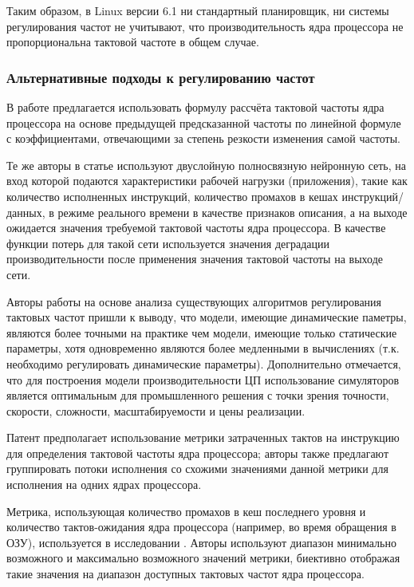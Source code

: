     Таким образом, в Linux версии 6.1 ни стандартный планировщик, ни системы регулирования частот
    не учитывают, что производительность ядра процессора не пропорциональна тактовой частоте
    в общем случае.

\subsubsection{Альтернативные подходы к регулированию частот}

    В работе \cite{liang2013performance} предлагается использовать формулу рассчёта тактовой частоты
    ядра процессора на основе предыдущей предсказанной частоты по линейной формуле с коэффициентами,
    отвечающими за степень резкости изменения самой частоты.

    Те же авторы в статье
    \cite{chen2018learning} используют двуслойную полносвязную нейронную сеть, на вход которой
    подаются характеристики рабочей нагрузки (приложения), такие как количество исполненных инструкций,
    количество промахов в кешах инструкций/данных, в режиме реального времени в качестве
    признаков описания, а на выходе ожидается значения требуемой тактовой частоты ядра процессора.
    В качестве функции потерь для такой сети используется значения деградации производительности после
    применения значения тактовой частоты на выходе сети.

    Авторы работы \cite{haririan2020dvfs} на основе анализа существующих алгоритмов регулирования
    тактовых частот пришли к выводу, что модели, имеющие динамические паметры, являются более точными
    на практике чем модели, имеющие только статические параметры, хотя одновременно являются более
    медленными в вычислениях (т.к. необходимо регулировать динамические параметры). Дополнительно
    отмечается, что для построения модели производительности ЦП использование симуляторов является
    оптимальным для промышленного решения с точки зрения точности, скорости, сложности,
    масштабируемости и цены реализации.

    Патент \cite{johnson2012frequency} предполагает использование метрики затраченных тактов на
    инструкцию для определения тактовой частоты ядра процессора; авторы также предлагают
    группировать потоки исполнения со схожими значениями данной метрики для исполнения на
    одних ядрах процессора.

    Метрика, использующая количество промахов в кеш последнего уровня и количество тактов-ожидания
    ядра процессора (например, во время обращения в ОЗУ), используется в исследовании \cite{hebbar2022pmu}.
    Авторы используют диапазон минимально возможного и максимально возможного значений метрики,
    биективно отображая такие значения на диапазон доступных тактовых частот ядра процессора.

